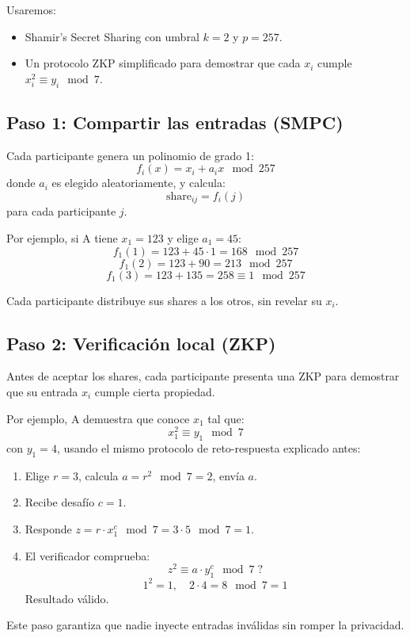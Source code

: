 \documentclass{article}
\begin{document}
Usaremos:
\begin{itemize}
    \item Shamir’s Secret Sharing con umbral \( k = 2 \) y \( p = 257 \).
    \item Un protocolo ZKP simplificado para demostrar que cada \( x_i \) cumple \( x_i^2 \equiv y_i \mod 7 \).
\end{itemize}

\subsection{Paso 1: Compartir las entradas (SMPC)}

Cada participante genera un polinomio de grado 1:
\[
f_i(x) = x_i + a_i x \mod 257
\]
donde \( a_i \) es elegido aleatoriamente, y calcula:
\[
\text{share}_{ij} = f_i(j)
\]
para cada participante \( j \).

Por ejemplo, si A tiene \( x_1 = 123 \) y elige \( a_1 = 45 \):
\[
f_1(1) = 123 + 45 \cdot 1 = 168 \mod 257
\]
\[
f_1(2) = 123 + 90 = 213 \mod 257
\]
\[
f_1(3) = 123 + 135 = 258 \equiv 1 \mod 257
\]

Cada participante distribuye sus shares a los otros, sin revelar su \( x_i \).

\subsection{Paso 2: Verificación local (ZKP)}

Antes de aceptar los shares, cada participante presenta una ZKP para demostrar que su entrada \( x_i \) cumple cierta propiedad.

Por ejemplo, A demuestra que conoce \( x_1 \) tal que:
\[
x_1^2 \equiv y_1 \mod 7
\]
con \( y_1 = 4 \), usando el mismo protocolo de reto-respuesta explicado antes:
\begin{enumerate}
    \item Elige \( r = 3 \), calcula \( a = r^2 \mod 7 = 2 \), envía \( a \).
    \item Recibe desafío \( c = 1 \).
    \item Responde \( z = r \cdot x_1^c \mod 7 = 3 \cdot 5 \mod 7 = 1 \).
    \item El verificador comprueba:
    \[
    z^2 \equiv a \cdot y_1^c \mod 7 \; ?
    \]
    \[
    1^2 = 1, \quad 2 \cdot 4 = 8 \mod 7 = 1
    \]
    Resultado válido.
\end{enumerate}

Este paso garantiza que nadie inyecte entradas inválidas sin romper la privacidad.
\end{document}
